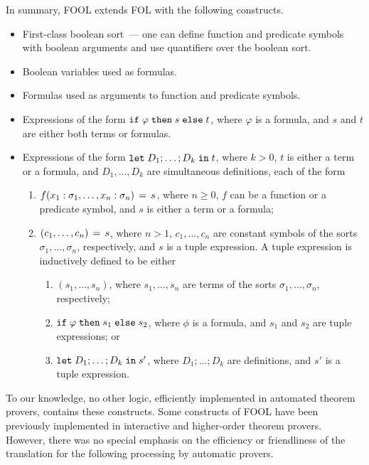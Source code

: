 In summary, FOOL extends FOL with the following constructs. 
\begin{itemize}
  \item First-class boolean sort~--- one can define function and predicate symbols with boolean arguments and use quantifiers over the boolean sort.
  \item Boolean variables used as formulas.
  \item Formulas used as arguments to function and predicate symbols.
  \item Expressions of the form $\mathtt{if}\;{\varphi}\;\allowbreak\mathtt{then}\;{s}\;\allowbreak\mathtt{else}\;{t}$, where $\varphi$ is a formula, and $s$ and $t$ are either both terms or formulas.
  \item Expressions of the form $\mathtt{let}\;{D_1;\ldots;D_k}\;\allowbreak\mathtt{in}\;{t}$, where $k > 0$, $t$ is either a term or a formula, and $D_1,\ldots,D_k$ are simultaneous definitions, each of the form
    \begin{enumerate}
      \item ${f(x_1:\sigma_1,\ldots,x_n:\sigma_n)}\,=\,{s}$, where $n \geq 0$, $f$ can be a function or a predicate symbol, and $s$ is either a term or a formula;
      \item ${(c_1,\ldots,c_n)}\,=\,{s}$, where $n > 1$, $c_1,\ldots,c_n$ are constant symbols of the sorts $\sigma_1,\ldots,\sigma_n$, respectively, and $s$ is a tuple expression. A tuple expression is inductively defined to be either
      \begin{enumerate}
        \item $(s_1,\ldots,s_n)$, where $s_1,\ldots,s_n$ are terms of the sorts $\sigma_1,\ldots,\sigma_n$, respectively;
        \item $\mathtt{if}\;{\varphi}\;\allowbreak\mathtt{then}\;{s_1}\;\allowbreak\mathtt{else}\;{s_2}$, where $\phi$ is a formula, and $s_1$ and $s_2$ are tuple expressions; or
        \item $\mathtt{let}\;{D_1;\ldots;D_k}\;\allowbreak\mathtt{in}\;{s'}$, where $D_1;\ldots;D_k$ are definitions, and $s'$ is a tuple expression.
      \end{enumerate}
    \end{enumerate}
\end{itemize}

To our knowledge, no other logic, efficiently implemented in automated theorem provers, contains these constructs. Some constructs of FOOL have been previously implemented in interactive and higher-order theorem provers. However, there was no special emphasis on the efficiency or friendliness of the translation for the following processing by automatic provers.

